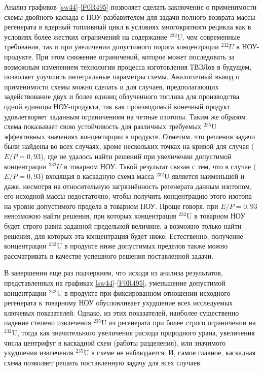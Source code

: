 Анализ графиков \ref{sw44}-\ref{F0R495} позволяет сделать заключение о применимости схемы двойного каскада с НОУ-разбавителем для задачи полного возврата массы регенерата в ядерный топливный цикл в условиях многократного рецикла как в условиях более жестких ограничений на содержание $^{232}U$, чем современные требования, так и при увеличении допустимого порога концентрации $^{232}U$ в НОУ-продукте. При этом снижение ограничений, которое может последовать за возможным изменением технологии процесса изготовления ТВЭЛов в будущем, позволяет улучшить интегральные параметры схемы. Аналогичный вывод о применимости схемы можно сделать и для случаев, предполагающих задействование двух и более единиц облученного топлива для производства одной единицы НОУ-продукта, так как производимый конечный продукт удовлетворяет заданным ограничениям на четные изотопы. Таким же образом схема показывает свою устойчивость для различных требуемых $^{235}$U эффективных значениях концентарции в продукте. Отметим, что решения задачи были найдены во всех случаях, кроме нескольких точках на кривой для случая ($E/P=0,93$), где не удалось найти решений при увеличении допустимой концентрации $^{232}U$ в товарном НОУ. Такой результат связан с тем, что в случае ($E/P=0,93$) входящая в каскадную схема масса $^{232}$U является наименьшей и даже, несмотря на относительную загрязнённость регенерата данным изотопом, его исходной массы недостаточно, чтобы получить концентрацию этого изотопа на уровне допустимого предела в товарном НОУ. Проще говоря, при $E/P=0,93$ невозможно найти решения, при которых концентрация $^{232}$U в товарном НОУ будет строго равна заданной предельной величине, а возможно только найти решения, для которых эта концентрация будет ниже. Естественно, получение концентрации $^{232}$U в продукте ниже допустимых пределов также можно рассматривать в качестве успешного решения поставленной задачи.  

В завершении еще раз подчеркнем, что исходя из анализа результатов, представленных на графиках \ref{sw44}-\ref{F0R495}, уменьшение допустимой концентрации $^{232}$U в продукте при фиксированном отношении исходного регенерата к товарному НОУ обусловливает ухудшение всех исследуемых ключевых показателей. Однако, из этих показателей, наиболее существенно падение степени извлечения $^{235}$U из регенерата при более строго ограничении на $^{232}$U, тогда как значительного увеличения расхода природного урана, увеличения числа центрифуг в каскадной схем (работы разделения), или значимого ухудшения извлечения $^{235}$U в схеме не наблюдается. И, самое главное, каскадная схема позволяет решить поставленную задачу для всех случаев.


